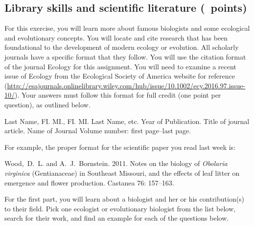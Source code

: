 \documentclass[12pt, addpoints, hidelinks]{exam}
\newcommand{\hidepoints}{%
	\pointsinmargin\pointformat{}
}
\begin{document}
\hidepoints

\subsection*{Library skills and scientific literature (\numpoints~points)}

For this exercise, you will learn more about famous
biologists and some ecological and evolutionary concepts. You will
locate and cite research that has been foundational to the development
of modern ecology or evolution. All scholarly journals have a specific format that
they follow. You will use the citation format of the journal 
Ecology for this assignment.  You will need
to examine a recent issue of Ecology from the Ecological Society of
America website for reference
(\url{http://esajournals.onlinelibrary.wiley.com/hub/issue/10.1002/ecy.2016.97.issue-10/}).
Your answers must follow this format for full credit (one point per question), as outlined below. 



%
Last Name, FI. MI., FI. MI. Last Name, etc. Year of
Publication. Title of journal article. Name of Journal Volume number:
first page–last page.

\vspace*{0.75\baselineskip}

For example, the proper format for the scientific paper you read last week is:

%
Wood,~D.~L. and A.~J.~Bornstein. 2011. Notes on the
biology of \textit{Obolaria virginica} (Gentianaceae) in Southeast
Missouri, and the effects of leaf litter on emergence and flower
production. Castanea 76: 157–163.

\vspace*{0.75\baselineskip}

For the first part, you will learn about a biologist and her or his contribution(s) to their field. Pick one ecologist or evolutionary biologist from the list below,
search for their work, and find an example for each of the questions
below.
\end{document}
